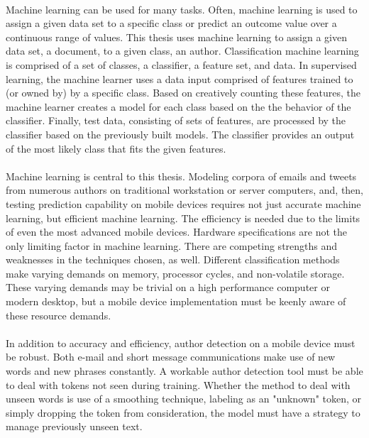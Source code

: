 	\paragraph{}Machine learning can be used for many tasks.  Often, machine learning is used to assign a given data set to a specific class or predict an outcome value over a continuous range of values. This thesis uses machine learning to assign a given data set, a document, to a given class, an author. Classification machine learning is comprised of a set of classes, a classifier, a feature set, and data.  In supervised learning, the machine learner uses a data input comprised of features trained to (or owned by) by a specific class.  Based on creatively counting these features, the machine learner creates a model for each class based on the the behavior of the classifier.  Finally, test data, consisting of sets of features, are processed by the classifier based on the previously built models.  The classifier provides an output of the most likely class that fits the given features.

	\paragraph{}Machine learning is central to this thesis.  Modeling corpora of emails and tweets from numerous authors on traditional workstation or server computers, and, then, testing prediction capability on mobile devices requires not just accurate machine learning, but efficient machine learning.  The efficiency is needed due to the limits of even the most advanced mobile devices. Hardware specifications are not the only limiting factor in machine learning.  There are competing strengths and weaknesses in the techniques chosen, as well.  Different classification methods make varying demands on memory, processor cycles, and non-volatile storage.  These varying demands may be trivial on a high performance computer or modern desktop, but a mobile device implementation must be keenly aware of these resource demands.
	
	\paragraph*{} In addition to accuracy and efficiency, author detection on a mobile device must be robust.  Both e-mail and short message communications make use of new words and new phrases constantly.  A workable author detection tool must be able to deal with tokens not seen during training.  Whether the method to deal with unseen words is use of a smoothing technique, labeling as an "unknown" token, or simply dropping the token from consideration, the model must have a strategy to manage previously unseen text.

